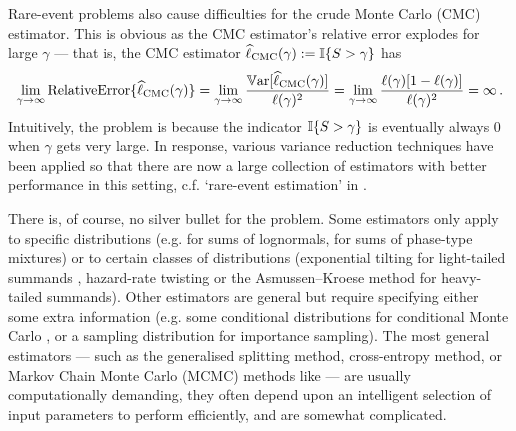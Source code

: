 Rare-event problems also cause difficulties for the crude Monte Carlo (CMC) estimator. This is obvious as the CMC estimator's relative error explodes for large $\gamma$ --- that is, the CMC estimator $\widehat{\ell}_{\text{CMC}}(\gamma) := \mathbb{I}\{ S > \gamma \}$ has
\[ \lim_{\gamma \to \infty} \text{RelativeError}\{ \widehat{\ell}_{\text{CMC}}(\gamma) \} = \lim_{\gamma \to \infty} \frac{ \operatorname{\mathbb{V}\mathrm{ar}}[ \widehat{\ell}_{\text{CMC}}(\gamma) ] }{ \ell(\gamma)^2 } = \lim_{\gamma \to \infty} \frac{  \ell(\gamma)[1-\ell(\gamma)] }{  \ell(\gamma)^2 } = \infty \,. \]
Intuitively, the problem is because the indicator $\mathbb{I}\{ S > \gamma \}$ is eventually always 0 when $\gamma$ gets very large. In response, various variance reduction techniques have been applied so that there are now a large collection of estimators with better performance in this setting, c.f. `rare-event estimation' in \cite{kroese2013handbook,asmussen2007stochastic,glasserman2003monte}.

There is, of course, no silver bullet for the problem. Some estimators only apply to specific distributions (e.g. \cite{botev2017fast} for sums of lognormals, \cite{yao2016estimating} for sums of phase-type mixtures) or to certain classes of distributions (exponential tilting for light-tailed summands \cite{kroese2013handbook,asmussen2007stochastic}, hazard-rate twisting or the Asmussen--Kroese method \cite{asmussen2006improved} for heavy-tailed summands). Other estimators are general but require specifying either some extra information (e.g. some conditional distributions for conditional Monte Carlo \cite{asmussen2017conditional}, or a sampling distribution for importance sampling). The most general estimators --- such as the generalised splitting method, cross-entropy method, or Markov Chain Monte Carlo (MCMC) methods like \cite{chan2012improved} --- are usually computationally demanding, they often depend upon an intelligent selection of input parameters to perform efficiently, and are somewhat complicated.

